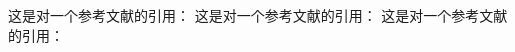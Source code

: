 \documentclass{ctexart}
\begin{document}
	这是对一个参考文献的引用：\cite{adams1993title}
	这是对一个参考文献的引用：\cite{abramowitz1972handbook}
	这是对一个参考文献的引用：\cite{_latex_2015}

	\nocite{*} %
	
	
\end{document}
